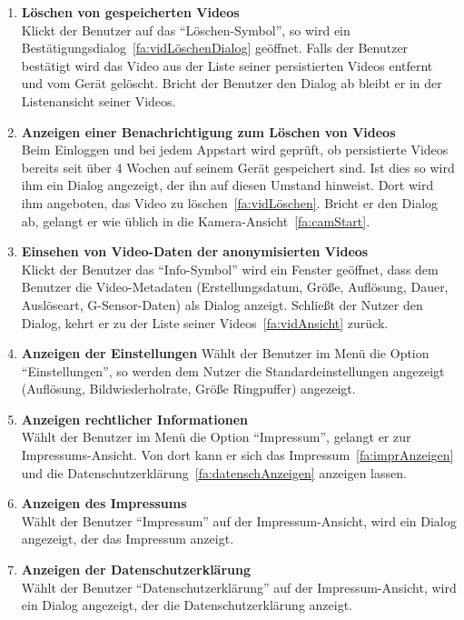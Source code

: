 \begin{enumerate}
\item \label{fa:vidLöschen}\textbf{Löschen von gespeicherten Videos} \hfill \\
Klickt der Benutzer auf das ``Löschen-Symbol'', so wird ein Bestätigungsdialog~\eqref{fa:vidLöschenDialog} geöffnet. Falls der Benutzer bestätigt wird das Video aus der Liste seiner persistierten Videos entfernt und vom Gerät gelöscht. Bricht der Benutzer den Dialog ab bleibt er in der Listenansicht seiner Videos.

\item \label{fa:vidLöschenDialog}\textbf{Anzeigen einer Benachrichtigung zum Löschen von Videos} \hfill \\
Beim Einloggen und bei jedem Appstart wird geprüft, ob persistierte Videos bereits seit über 4 Wochen auf seinem Gerät gespeichert sind. Ist dies so wird ihm ein Dialog angezeigt, der ihn auf diesen Umstand hinweist. Dort wird ihm angeboten, das Video zu löschen~\eqref{fa:vidLöschen}. Bricht er den Dialog ab, gelangt er wie üblich in die Kamera-Ansicht~\eqref{fa:camStart}.

\item \label{fa:metaVerschlVid}\textbf{Einsehen von Video-Daten der anonymisierten Videos} \hfill \\
Klickt der Benutzer das ``Info-Symbol'' wird ein Fenster geöffnet, dass dem Benutzer die Video-Metadaten (Erstellungsdatum, Größe, Auflösung, Dauer, Auslöseart, G-Sensor-Daten) als Dialog anzeigt. Schließt der Nutzer den Dialog, kehrt er zu der Liste seiner Videos~\eqref{fa:vidAnsicht} zurück.

\item \label{fa:einstAnsicht}\textbf{Anzeigen der Einstellungen}
Wählt der Benutzer im Menü die Option ``Einstellungen'', so werden dem Nutzer die Standardeinstellungen angezeigt (Auflösung, Bildwiederholrate, Größe Ringpuffer) angezeigt.

\item \label{fa:imprAnsicht}\textbf{Anzeigen rechtlicher Informationen} \hfill \\
Wählt der Benutzer im Menü die Option ``Impressum'', gelangt er zur Impressums-Ansicht. Von dort kann er sich das Impressum~\eqref{fa:imprAnzeigen} und die Datenschutzerklärung~\eqref{fa:datenschAnzeigen} anzeigen lassen.

\item \label{fa:imprAnzeigen}\textbf{Anzeigen des Impressums} \hfill \\
Wählt der Benutzer ``Impressum'' auf der Impressum-Ansicht, wird ein Dialog angezeigt, der das Impressum anzeigt.

\item  \label{fa:datenschAnzeigen}\textbf{Anzeigen der Datenschutzerklärung} \hfill \\
Wählt der Benutzer ``Datenschutzerklärung'' auf der Impressum-Ansicht, wird ein Dialog angezeigt, der die Datenschutzerklärung anzeigt.

\end{enumerate}

